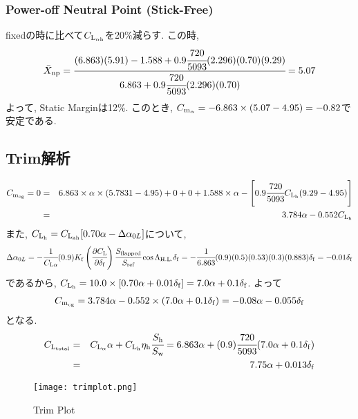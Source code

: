 \documentclass[12pt]{jsarticle}
\begin{document}
\subsubsection*{Power-off Neutral Point (Stick-Free)}
fixedの時に比べて$C_{\rm L_{\alpha h}}$を20\%減らす. この時,
\begin{eqnarray*}
\bar{X}_{\rm np} = \cfrac{(6.863)(5.91) - 1.588 + 0.9\cfrac{720}{5093}(2.296)(0.70)(9.29)}{6.863+0.9\cfrac{720}{5093}(2.296)(0.70)} = 5.07
\end{eqnarray*}
よって, Static Marginは12\%. このとき, $C_{\rm m_{\alpha}} = -6.863\times (5.07 - 4.95) = -0.82$で安定である.

\subsection{Trim解析}
\begin{eqnarray*}
C_{\rm m_{cg}} = 0 &=& 6.863 \times \alpha \times (5.7831 - 4.95) + 0 + 0 + 1.588\times \alpha - \left[0.9\cfrac{720}{5093}C_{\rm L_{h}}(9.29-4.95) \right] \\
&=& 3.784\alpha - 0.552C_{\rm L_{h}}
\end{eqnarray*}
また, $C_{\rm L_h} = C_{\rm L_{ah}} [0.70\alpha - \Delta\alpha_{0L}]$について,
\begin{eqnarray*}
\Delta\alpha_{0L} = -\cfrac{1}{C_{\rm L\alpha}}(0.9)K_{\rm f}\left(\cfrac{\partial C_{\rm L}}{\partial \delta_{\rm f}}\right)\cfrac{S_{\rm flapped}}{S_{\rm ref}}\cos\Lambda_{\rm H.L.}\delta_{\rm f} = -\cfrac{1}{6.863}(0.9)(0.5)(0.53)(0.3)(0.883)\delta_{\rm f} = -0.01\delta_{\rm f}
\end{eqnarray*}
であるから, $C_{\rm L_h} = 10.0\times [0.70\alpha + 0.01\delta_{\rm f}] = 7.0\alpha + 0.1\delta_{\rm f}$. よって
\begin{eqnarray*}
C_{\rm m_{cg}} = 3.784\alpha - 0.552\times(7.0\alpha + 0.1\delta_{\rm f}) = -0.08\alpha - 0.055\delta_{\rm f}
\end{eqnarray*}
となる.
\begin{eqnarray*}
C_{\rm L_{total}} &=& C_{\rm L_{\alpha}}\alpha + C_{\rm L_h}\eta_{\rm h}\cfrac{S_{\rm h}}{S_{\rm w}}
= 6.863\alpha + (0.9)\cfrac{720}{5093}(7.0\alpha + 0.1\delta_{\rm f}) \\
&=& 7.75\alpha + 0.013\delta_{\rm f}
\end{eqnarray*}

\begin{figure}[H]
\begin{center}
\texttt{[image: trimplot.png]}
\caption{Trim Plot}
\end{center}
\end{figure}
\end{document}
